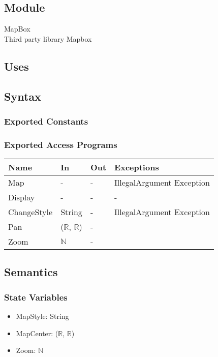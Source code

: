 \documentclass[12pt, titlepage]{article}
\begin{document}
\subsection{Module}

MapBox\\
Third party library Mapbox

\subsection{Uses}

\subsection{Syntax}

\subsubsection{Exported Constants}

\subsubsection{Exported Access Programs}

\begin{center}
\begin{tabular}{p{2cm} p{4cm} p{4cm} p{2cm}}
\hline
\textbf{Name} & \textbf{In} & \textbf{Out} & \textbf{Exceptions} \\
\hline
Map & - & - & IllegalArgument Exception\\
Display & - & - & - \\
ChangeStyle & String & - & IllegalArgument Exception\\
Pan & ($\mathbb{R}$, $\mathbb{R}$) & -\\
Zoom &  $\mathbb{N}$ & -\\

\hline
\end{tabular}
\end{center}

\subsection{Semantics}

\subsubsection{State Variables}

\begin{itemize}
\item MapStyle: String
\item MapCenter: ($\mathbb{R}$, $\mathbb{R}$)
\item Zoom: $\mathbb{N}$
\end{itemize}
\end{document}
